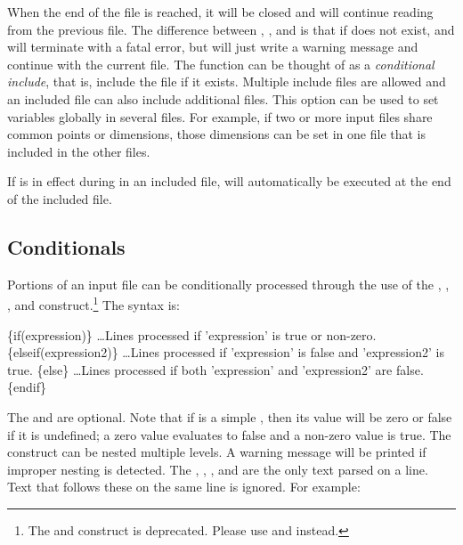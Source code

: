When the end of the file is reached, it will be closed and \aprepro{}
will continue reading from the previous file. The difference between
, , and  is that if  does
not exist,  and  will terminate \aprepro{} with a fatal
error, but  will just write a warning message and
continue with the current file. The  function can be
thought of as a {\em conditional include}, that is, include the file
if it exists. Multiple include files are allowed and an included file
can also include additional files. This option can be used to set
variables globally in several files. For example, if two or more input
files share common points or dimensions, those dimensions can be set
in one file that is included in the other files.

If  is in effect during in an included file, 
will automatically be executed at the end of the included file.

\subsection{Conditionals} Portions of an input file can be conditionally processed
through the use of the , , , and 
construct.\footnote{The  and  construct is deprecated. Please use  and  instead.}
The syntax is:

\begin{apinp}
\{if(expression)\}
\ldots Lines processed if 'expression' is true or non-zero.
\{elseif(expression2)\}
\ldots Lines processed if 'expression' is false and 'expression2' is true.
\{else\}
\ldots Lines processed if both 'expression' and 'expression2' are false.
\{endif\}
\end{apinp}

The  and  are optional.  Note that if  is a simple , then its value will be zero or false if it is undefined; a zero value evaluates to false and a non-zero value is true. The  construct can be nested multiple levels.
A warning message will be printed if improper nesting is detected. The ,
, , and  are the
only text parsed on a line. Text that follows these on the same line is
ignored.  For example:

